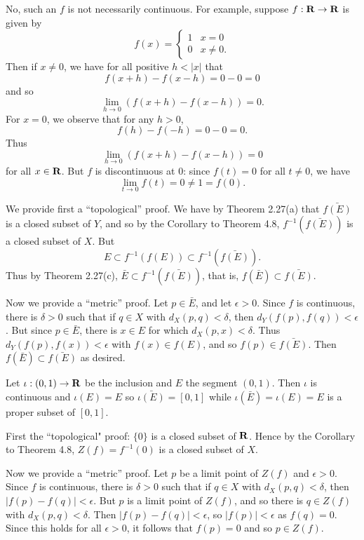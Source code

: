 \begin{ex}
No, such an $f$ is not necessarily continuous. For example, suppose $f: \mathbf{R} \to \mathbf{R}$ is given by \[f(x) = \begin{cases}
1 & x = 0\\
0 & x \not = 0.
\end{cases}\] Then if $x \not = 0$, we have for all positive $h < |x|$ that \[f(x + h) - f(x - h) = 0 - 0 = 0\] and so \[\lim_{h\to 0}(f(x+h) - f(x-h)) = 0.\] For $x = 0$, we observe that for any $h > 0$, \[f(h) - f(-h) = 0 - 0 = 0.\] Thus \[\lim_{h\to 0}(f(x+h) - f(x-h)) = 0\] for all $x \in \mathbf{R}$. But $f$ is discontinuous at 0: since $f(t) = 0$ for all $t \not = 0$, we have \[\lim_{t \to 0}f(t) = 0 \not = 1 = f(0).\]
\end{ex}

\begin{ex}
We provide first a ``topological'' proof. We have by Theorem 2.27(a) that $\bar{f(E)}$ is a closed subset of $Y$, and so by the Corollary to Theorem 4.8, $f^{-1}(\bar{f(E)})$ is a closed subset of $X$. But \[E \subset f^{-1}(f(E)) \subset f^{-1}(\bar{f(E)}).\] Thus by Theorem 2.27(c), $\bar{E} \subset f^{-1}(\bar{f(E)})$, that is, $f(\bar{E}) \subset \bar{f(E)}$.

Now we provide a ``metric'' proof. Let $p \in \bar{E}$, and let $\epsilon > 0$. Since $f$ is continuous, there is $\delta > 0$ such that if $q \in X$ with $d_X(p, q) < \delta$, then $d_Y(f(p), f(q)) < \epsilon$. But since $p \in \bar{E}$, there is $x \in E$ for which $d_X(p, x) < \delta$. Thus $d_Y(f(p), f(x)) < \epsilon$ with $f(x) \in f(E)$, and so $f(p) \in \bar{f(E)}$. Then $f(\bar{E}) \subset \bar{f(E)}$ as desired.

Let $\iota: (0, 1) \to \mathbf{R}$ be the inclusion and $E$ the segment $(0, 1)$. Then $\iota$ is continuous and $\iota(E) = E$ so $\bar{\iota(E)} = [0, 1]$ while $\iota(\bar{E}) = \iota(E) = E$ is a proper subset of $[0, 1]$.
\end{ex}

\begin{ex}
First the ``topological" proof: $\{0\}$ is a closed subset of $\mathbf{R}$. Hence by the Corollary to Theorem 4.8, $Z(f) = f^{-1}(0)$ is a closed subset of $X$.

Now we provide a ``metric'' proof. Let $p$ be a limit point of $Z(f)$ and $\epsilon > 0$. Since $f$ is continuous, there is $\delta > 0$ such that if $q \in X$ with $d_X(p, q) < \delta$, then $|f(p) - f(q)| < \epsilon$. But $p$ is a limit point of $Z(f)$, and so there is $q \in Z(f)$ with $d_X(p, q) < \delta$. Then $|f(p) - f(q)| < \epsilon$, so $|f(p)| < \epsilon$ as $f(q) = 0$. Since this holds for all $\epsilon > 0$, it follows that $f(p) = 0$ and so $p \in Z(f)$.
\end{ex}

